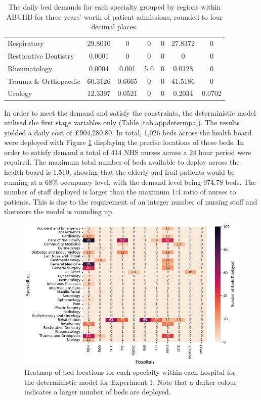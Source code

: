 \documentclass[../thesis.tex]{subfiles}
\begin{document}
\begin{table}[h!]
{\begin{tabular}{lcccccc}
Respiratory& 	29.8010& 	0& 	0& 	0& 	27.8372	& 0 \\
Restorative Dentistry& 	0.0001	& 0& 	0& 	0& 	0& 	0\\
Rheumatology& 	0.0004& 	0.001& 5	0& 	0& 	0.0128& 	0\\
Trauma \& Orthopaedic	& 60.3126& 	0.6665	& 0& 	0& 	41.5186& 	0\\
Urology& 	12.3397& 	0.0521	& 0& 	0& 	0.2034& 	0.0702\\
\bottomrule
    \end{tabular}}
    \caption{The daily bed demands for each specialty grouped by regions within ABUHB for three years' worth of patient admissions, rounded to four decimal places.}
    \label{tab:regionaldemands1}
\end{table}

In order to meet the demand and satisfy the constraints, the deterministic model utilised the first stage variables only (Table \ref{tab:appdetermpa}). The results yielded a daily cost of $\pounds$904,280.80. In total, 1,026 beds across the health board were deployed with Figure \ref{fig:detHeatmap1} displaying the precise locations of these beds. In order to satisfy demand a total of 414 NHS nurses across a 24 hour period were required. The maximum total number of beds available to deploy across the health board is 1,510, showing that the elderly and frail patients would be running at a 68\% occupancy level, with the demand level being 974.78 beds. The number of staff deployed is larger than the maximum 1:4 ratio of nurses to patients. This is due to the requirement of an integer number of nursing staff and therefore the model is rounding up.

\begin{figure}[h!]
    \centering
    \includegraphics[scale=1]{Chapters/Chapter5/Figuresnew/Determin.png}
    \caption{Heatmap of bed locations for each specialty within each hospital for the deterministic model for Experiment 1. Note that a darker colour indicates a larger number of beds are deployed.}
    \label{fig:detHeatmap1}
\end{figure}
\end{document}
